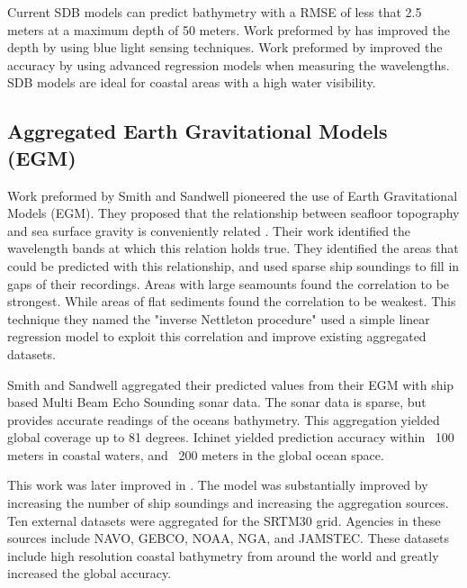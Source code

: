 \par
Current \ac{SDB} models can predict bathymetry with a \ac{RMSE} of less that 2.5 meters at a maximum depth of 50 meters.
Work preformed by \cite{vinayaraj2016satellite} has improved the depth by using blue light sensing techniques.
Work preformed by \cite{chybicki2018three} improved the accuracy by using advanced regression models when measuring the wavelengths.
\ac{SDB} models are ideal for coastal areas with a high water visibility.

\subsection{Aggregated Earth Gravitational Models (EGM)}
Work preformed by Smith and Sandwell \cite{smith1994bathymetric}\cite{smith1997global} pioneered the use of Earth Gravitational Models (EGM).
They proposed that the relationship between seafloor topography and sea surface gravity is conveniently related \cite{smith1994bathymetric}.
Their work identified the wavelength bands at which this relation holds true.
They identified the areas that could be predicted with this relationship, and used sparse ship soundings to fill in gaps of their recordings.
Areas with large seamounts found the correlation to be strongest.
While areas of flat sediments found the correlation to be weakest.
This technique they named the "inverse Nettleton procedure" used a simple linear regression model to exploit this correlation and improve existing aggregated datasets.

\par
Smith and Sandwell aggregated their predicted values from their \ac{EGM} with ship based Multi Beam Echo Sounding sonar data.
The sonar data is sparse, but provides accurate readings of the oceans bathymetry.
This aggregation yielded global coverage up to 81 degrees.
Ichinet yielded prediction accuracy within ~100 meters in coastal waters, and ~200 meters in the global ocean space.

\par 
This work was later improved in \cite{becker2009global}.
The model was substantially improved by increasing the number of ship soundings and increasing the aggregation sources.
Ten external datasets were aggregated for the SRTM30 grid.
Agencies in these sources include \ac{NAVO}, \ac{GEBCO}, \ac{NOAA}, \ac{NGA}, and \ac{JAMSTEC}.
These datasets include high resolution coastal bathymetry from around the world and greatly increased the global accuracy.

